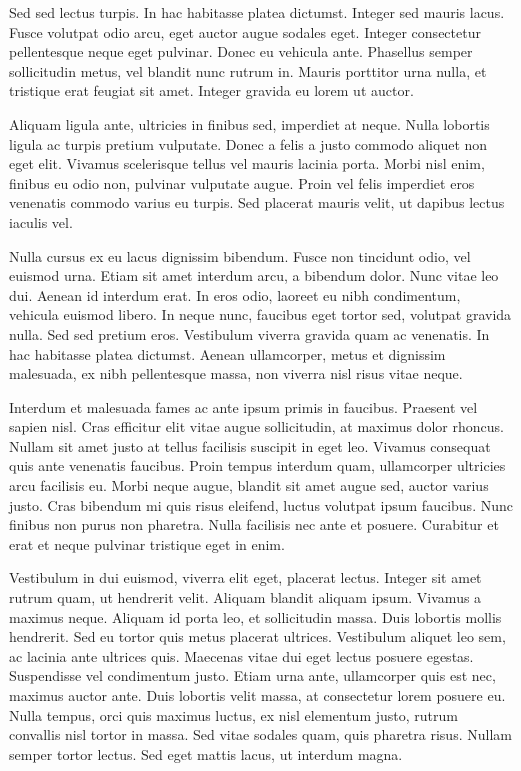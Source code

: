 Sed sed lectus turpis. In hac habitasse platea dictumst. Integer sed mauris lacus. Fusce volutpat odio arcu, eget auctor augue sodales eget. Integer consectetur pellentesque neque eget pulvinar. Donec eu vehicula ante. Phasellus semper sollicitudin metus, vel blandit nunc rutrum in. Mauris porttitor urna nulla, et tristique erat feugiat sit amet. Integer gravida eu lorem ut auctor.

Aliquam ligula ante, ultricies in finibus sed, imperdiet at neque. Nulla lobortis ligula ac turpis pretium vulputate. Donec a felis a justo commodo aliquet non eget elit. Vivamus scelerisque tellus vel mauris lacinia porta. Morbi nisl enim, finibus eu odio non, pulvinar vulputate augue. Proin vel felis imperdiet eros venenatis commodo varius eu turpis. Sed placerat mauris velit, ut dapibus lectus iaculis vel.

Nulla cursus ex eu lacus dignissim bibendum. Fusce non tincidunt odio, vel euismod urna. Etiam sit amet interdum arcu, a bibendum dolor. Nunc vitae leo dui. Aenean id interdum erat. In eros odio, laoreet eu nibh condimentum, vehicula euismod libero. In neque nunc, faucibus eget tortor sed, volutpat gravida nulla. Sed sed pretium eros. Vestibulum viverra gravida quam ac venenatis. In hac habitasse platea dictumst. Aenean ullamcorper, metus et dignissim malesuada, ex nibh pellentesque massa, non viverra nisl risus vitae neque.

Interdum et malesuada fames ac ante ipsum primis in faucibus. Praesent vel sapien nisl. Cras efficitur elit vitae augue sollicitudin, at maximus dolor rhoncus. Nullam sit amet justo at tellus facilisis suscipit in eget leo. Vivamus consequat quis ante venenatis faucibus. Proin tempus interdum quam, ullamcorper ultricies arcu facilisis eu. Morbi neque augue, blandit sit amet augue sed, auctor varius justo. Cras bibendum mi quis risus eleifend, luctus volutpat ipsum faucibus. Nunc finibus non purus non pharetra. Nulla facilisis nec ante et posuere. Curabitur et erat et neque pulvinar tristique eget in enim.

Vestibulum in dui euismod, viverra elit eget, placerat lectus. Integer sit amet rutrum quam, ut hendrerit velit. Aliquam blandit aliquam ipsum. Vivamus a maximus neque. Aliquam id porta leo, et sollicitudin massa. Duis lobortis mollis hendrerit. Sed eu tortor quis metus placerat ultrices. Vestibulum aliquet leo sem, ac lacinia ante ultrices quis. Maecenas vitae dui eget lectus posuere egestas. Suspendisse vel condimentum justo. Etiam urna ante, ullamcorper quis est nec, maximus auctor ante. Duis lobortis velit massa, at consectetur lorem posuere eu. Nulla tempus, orci quis maximus luctus, ex nisl elementum justo, rutrum convallis nisl tortor in massa. Sed vitae sodales quam, quis pharetra risus. Nullam semper tortor lectus. Sed eget mattis lacus, ut interdum magna.

